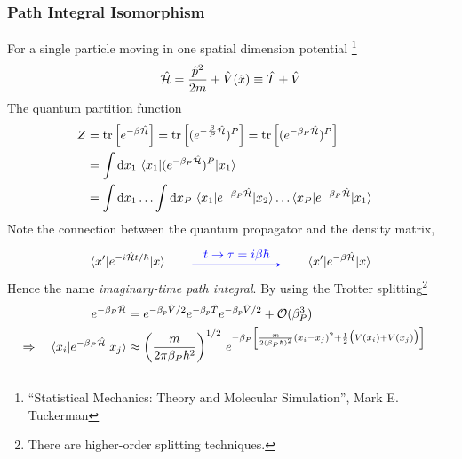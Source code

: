 \begin{frame}[allowframebreaks]
  \frametitle{Path Integral Isomorphism}
  For a single particle moving in one spatial dimension potential
  \footnote[frame]{
   ``Statistical Mechanics: Theory and Molecular Simulation'', Mark E. Tuckerman 
  }
  $$
  \hat{\cal H} = \frac{\hat{p}^2}{2m} + \hat{V}(\hat{x}) \equiv \hat{T} + \hat{V}
  $$
  The quantum partition function
  \begin{align*}
    \label{eq:quantum_partition_function}
    Z &= \operatorname{tr}\left[e^{-\beta\hat{\cal H}}\right]
        = \operatorname{tr}\left[(e^{-{\beta\over P}\hat{\cal H}})^P\right]
        = \operatorname{tr}\left[(e^{-{\beta_P}\hat{\cal H}})^P\right]
        \cr
    &= \int\mathrm{d}x_1\,
      \braket{ x_1| (e^{-\beta_P\hat{\cal H}})^P | x_1} \cr
    &= \int\mathrm{d}x_1\ldots\int\mathrm{d}x_P\,
      \braket{ x_1| e^{-\beta_P\hat{\cal H}} | x_2}
      \ldots
      \braket{ x_P| e^{-\beta_P\hat{\cal H}} | x_1}
  \end{align*}
  Note the connection between the quantum propagator and the density matrix,
  \begin{equation*}
    \label{eq:density_mat_and_propagator}
    \braket{ x'| e^{-i\hamil t/\hbar} | x}
    \qquad
    \tikz \draw [->, >=stealth, blue, line width=0.5pt] (0, 0) -- node[above,
    midway]{$t \to \tau= i\beta\hbar$} (2.5, 0.0);
    \qquad
    \braket{ x'| e^{-\beta\hamil} | x}
  \end{equation*}
  Hence the name \emph{imaginary-time path integral}. By using the Trotter splitting\footnote[frame]{
    There are higher-order splitting techniques.
  }
  \begin{align*}
    e^{-\beta_P\hat{\cal H}} &=
    e^{-\beta_p\hat{V}/2}e^{-\beta_p\hat{T}}e^{-\beta_p\hat{V}/2} +
    {\cal O}(\beta_P^3) \cr
    \Rightarrow \quad \braket{ x_i| e^{-\beta_P\hat{\cal H}} | x_j} &\approx
    \left(m \over2\pi\beta_P\hbar^2\right)^{1/2}\,
    e^{
      -\beta_P
      \left[
         {m\over2(\beta_P\hbar)^2} (x_i - x_j)^2
                                                          + 
        {1\over2} \bigl(V(x_i) + V(x_j)\bigr)
      \right]
    }
  \end{align*}
  

\end{frame}
